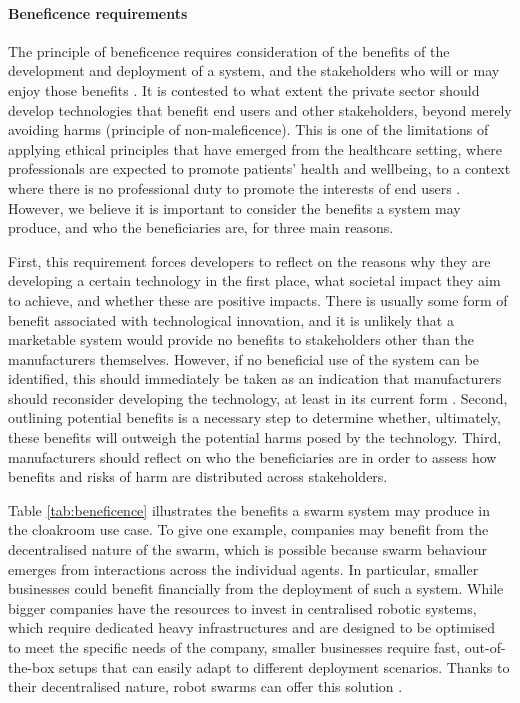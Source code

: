 \documentclass[lettersize,journal]{IEEEtran}
\begin{document}
\paragraph*{Beneficence requirements}
The principle of beneficence requires consideration of the benefits of the development and deployment of a system, and the stakeholders who will or may enjoy those benefits \cite{Porter2022}. It is contested to what extent the private sector should develop technologies that  benefit end users and other stakeholders, beyond merely avoiding harms (principle of non-maleficence). This is one of the limitations of applying ethical principles that have emerged from the healthcare setting, where professionals are expected to promote patients’ health and wellbeing, to a context where there is no professional duty to promote the interests of end users \cite{mittelstadt2019principles}. However, we believe it is important to consider the benefits a system may produce, and who the beneficiaries are, for three main reasons.

First, this requirement forces developers to reflect on the reasons why they are developing a certain technology in the first place, what societal impact they aim to achieve, and whether these are positive impacts. There is usually some form of benefit associated with technological innovation, and it is unlikely that a marketable system would provide no benefits to stakeholders other than the manufacturers themselves. However, if no  beneficial use of the system can be identified, this should immediately be taken as an indication that manufacturers should reconsider developing the technology, at least in its current form \cite{Qin}. Second, outlining potential benefits is a necessary step to determine whether, ultimately, these benefits will outweigh the potential harms posed by the technology. Third, manufacturers should reflect on who the beneficiaries are in order to assess how benefits and risks of harm are distributed across stakeholders.

Table \ref{tab:beneficence} illustrates the benefits a swarm system may produce in the cloakroom use case. To give one example, companies may benefit from the decentralised nature of the swarm, which is possible because swarm behaviour emerges from interactions across the individual agents. In particular, smaller businesses could benefit financially from the deployment of such a system. While bigger companies have the resources to invest in centralised robotic systems, which require dedicated heavy infrastructures and are designed to be optimised to meet the specific needs of the company, smaller businesses require fast, out-of-the-box setups that can easily adapt to different deployment scenarios. Thanks to their decentralised nature, robot swarms can offer this solution \cite{Jones2020}.
\\
\end{document}
